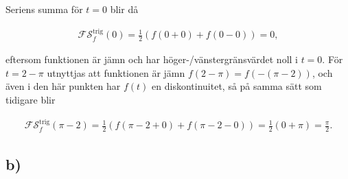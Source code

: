 \documentclass[a4paper]{article}
\begin{document}
Seriens summa för $t = 0$ blir då

\begin{align*}
  \mathcal{FS}_f^{\text{trig}}(0) = \frac{1}{2}\left( f(0 + 0) + f(0 - 0) \right) = 0,
\end{align*}

eftersom funktionen är jämn och har höger-/vänstergränsvärdet noll i $t = 0$.
För $t = 2 - \pi$ utnyttjas att funktionen är jämn $f(2 - \pi) = f(-(\pi - 2))$,
och även i den här punkten har $f(t)$ en diskontinuitet, så på samma sätt som
tidigare blir

\begin{align*}
  \mathcal{FS}_f^{\text{trig}}(\pi - 2) = \frac{1}{2}\left( f(\pi - 2 + 0) + f(\pi - 2 - 0) \right) = \frac{1}{2}(0 + \pi) = \frac{\pi}{2}.
\end{align*}

\subsection*{b)}
\end{document}
